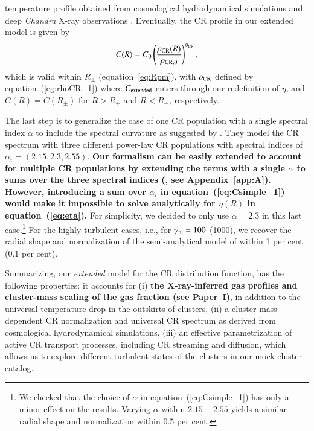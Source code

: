 \documentclass[useAMS,usenatbib]{mn2e}
\begin{document}
temperature profile obtained from cosmological hydrodynamical simulations
\citep{2007MNRAS.378..385P,2010MNRAS.409..449P} and deep {\em Chandra} X-ray
observations \citep{2005ApJ...628..655V}. Eventually, the CR profile in our
extended model is given by
\begin{equation}
C(R)=C_{0}\left(\frac{\rho_{{\mathrm{CR}}}(R)}{\rho_{{\mathrm{CR}},0}}\right)^{\beta_{{\mathrm{CR}}}},
\label{eq:Cf2}
\end{equation} 
which is valid within $R_{\pm}$ (equation~\ref{eq:Rpm}), with
$\rho_{{\mathrm{CR}}}$ defined by equation~(\ref{eg:rhoCR_1}) where
$C_{{\mathrm{extended}}}$ enters through our redefinition of $\eta$, and $C(R) =
C(R_{\pm})$ for $R > R_{+}$ and $R < R_{-}$, respectively.

The last step is to generalize the case of one CR population with a single
spectral index $\alpha$ to include the spectral curvature as suggested by
\cite{2010MNRAS.409..449P}. They model the CR spectrum with three different
power-law CR populations with spectral indices of
$\alpha_{i}=(2.15,2.3,2.55)$. {\bf Our formalism can be easily extended to
  account for multiple CR populations by extending the terms with a single
  $\alpha$ to sums over the three spectral indices
  (\citealp{2010MNRAS.409..449P}, see Appendix~\ref{app:A}). However,
  introducing a sum over $\alpha_{i}$ in equation~(\ref{eq:Csimple_1}) would
  make it impossible to solve analytically for $\eta(R)$ in
  equation~(\ref{eq:eta}).} For simplicity, we decided to only use $\alpha =
2.3$ in this last case.\footnote{We checked that the choice of $\alpha$ in
  equation~(\ref{eq:Csimple_1}) has only a minor effect on the results. Varying
  $\alpha$ within $2.15-2.55$ yields a similar radial shape and normalization
  within 0.5 per cent.} For the highly turbulent cases, i.e., for
$\gamma_{{\mathrm{tu}}}=100$ (1000), we recover the radial shape and normalization of
the semi-analytical model of \cite{2010MNRAS.409..449P} within 1 per cent (0.1
per cent).

Summarizing, our \emph{extended} model for the CR distribution function, has the
following properties: it accounts for (i) {\bf the X-ray-inferred gas
profiles and cluster-mass scaling of the gas fraction (see Paper~I)}, in addition to the
universal temperature drop in the outskirts of clusters, (ii) a cluster-mass
dependent CR normalization and universal CR spectrum as derived from
cosmological hydrodynamical simulations, (iii) an effective parametrization of
active CR transport processes, including CR streaming and diffusion, which
allows us to explore different turbulent states of the clusters in our mock
cluster catalog.
\end{document}

